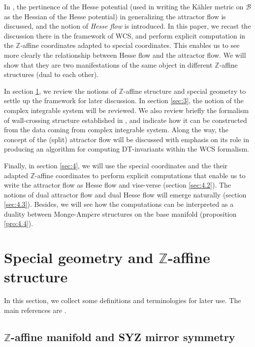 \documentclass{article}
\begin{document}
In \cite{svan2012bps}, the pertinence of the Hesse potential (used in writing the K\"ahler metric on $\mathcal{B}$ as the Hessian of the Hesse potential) in generalizing the attractor flow is discussed, and the notion of \textit{Hesse flow} is introduced. In this paper, we recast the discussion there in the framework of WCS, and perform explicit computation in the $\mathbb{Z}$-affine coordinates adapted to special coordinates. This enables us to see more clearly the relationship between Hesse flow and the attractor flow. We will show that they are two manifestations of the same object in different $\mathbb{Z}$-affine structures (dual to each other). 

In section \ref{sec:2}, we review the notions of $\mathbb{Z}$-affine structure and special geometry to settle up the framework for later discussion. In section \ref{sec:3}, the notion of the complex integrable system will be reviewed. We also review briefly the formalism of wall-crossing structure established in \cite{kontsevich2014wall}, and indicate how it can be constructed from the data coming from complex integrable system. Along the way, the concept of the (split) attractor flow will be discussed with emphasis on its role in producing an algorithm for computing DT-invariants within the WCS formalism. 

Finally, in section \ref{sec:4}, we will use the special coordinates and the their adapted $\mathbb{Z}$-affine coordinates to perform explicit computations that enable us to write the attractor flow as Hesse flow and vise-verse (section \ref{sec:4.2}). The notions of dual attractor flow and dual Hesse flow will emerge naturally (section \ref{sec:4.3}). Besides, we will see how the computations can be interpreted as a duality between Monge-Amp$\grave{e}$re structures on the base manifold (proposition \ref{pro:4.4}).  

\section{Special geometry and \texorpdfstring{$\mathbb{Z}$}--affine structure}\label{sec:2}
In this section, we collect some definitions and terminologies for later use. The main references are \cite{freed1999special}\cite{alekseevsky2002special}\cite{gross2003affine}.
\subsection{\texorpdfstring{$\mathbb{Z}$}--affine manifold and SYZ mirror symmetry}
\end{document}
